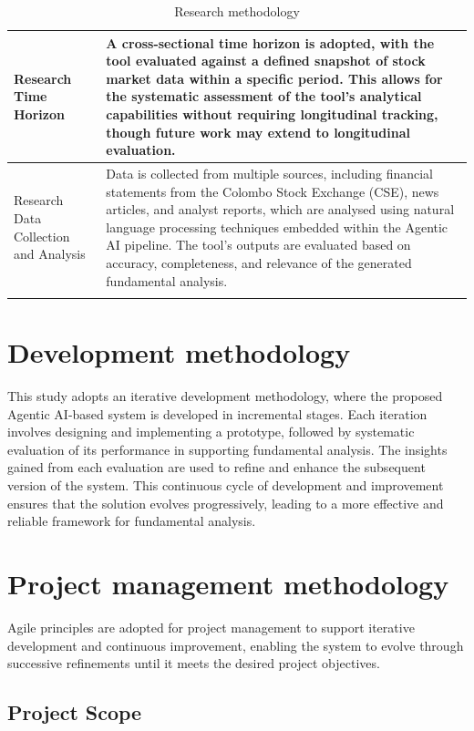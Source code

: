 \begin{longtable}{|p{4.8cm}|p{10cm}|}
    \hline
    Research Time Horizon &
    A cross-sectional time horizon is adopted, with the tool evaluated
    against a defined snapshot of stock market data within a specific
    period. This allows for the systematic assessment of the tool's
    analytical capabilities without requiring longitudinal tracking,
    though future work may extend to longitudinal evaluation. \\
    \hline
    Research Data Collection and Analysis &
    Data is collected from multiple sources, including financial
    statements from the Colombo Stock Exchange (CSE), news articles,
    and analyst reports, which are analysed using natural language
    processing techniques embedded within the Agentic AI pipeline.
    The tool's outputs are evaluated based on accuracy, completeness,
    and relevance of the generated fundamental analysis. \\
    \hline
    \caption{Research methodology}
    \label{tab:research-methodology}
\end{longtable}

\section{Development methodology}

This study adopts an iterative development methodology, where the proposed Agentic AI-based system is developed in incremental stages. Each iteration involves designing and implementing a prototype, followed by systematic evaluation of its performance in supporting fundamental analysis. The insights gained from each evaluation are used to refine and enhance the subsequent version of the system. This continuous cycle of development and improvement ensures that the solution evolves progressively, leading to a more effective and reliable framework for fundamental analysis. 

\section{Project management methodology}

Agile principles are adopted for project management to support iterative development and continuous improvement, enabling the system to evolve through successive refinements until it meets the desired project objectives.

\subsection{Project Scope}

